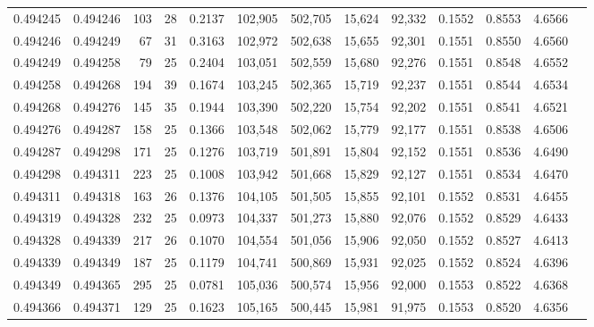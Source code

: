 \begin{tabular}{rrrrrrrrrrrrr}
0.494245 & 0.494246 & 103 &  28 &                                     0.2137 & 102,905 & 502,705 &  15,624 &  92,332 & 0.1552 & 0.8553 & 4.6566 \\
0.494246 & 0.494249 &  67 &  31 &                                     0.3163 & 102,972 & 502,638 &  15,655 &  92,301 & 0.1551 & 0.8550 & 4.6560 \\
0.494249 & 0.494258 &  79 &  25 &                                     0.2404 & 103,051 & 502,559 &  15,680 &  92,276 & 0.1551 & 0.8548 & 4.6552 \\
0.494258 & 0.494268 & 194 &  39 &                                     0.1674 & 103,245 & 502,365 &  15,719 &  92,237 & 0.1551 & 0.8544 & 4.6534 \\
0.494268 & 0.494276 & 145 &  35 &                                     0.1944 & 103,390 & 502,220 &  15,754 &  92,202 & 0.1551 & 0.8541 & 4.6521 \\
0.494276 & 0.494287 & 158 &  25 &                                     0.1366 & 103,548 & 502,062 &  15,779 &  92,177 & 0.1551 & 0.8538 & 4.6506 \\
0.494287 & 0.494298 & 171 &  25 &                                     0.1276 & 103,719 & 501,891 &  15,804 &  92,152 & 0.1551 & 0.8536 & 4.6490 \\
0.494298 & 0.494311 & 223 &  25 &                                     0.1008 & 103,942 & 501,668 &  15,829 &  92,127 & 0.1551 & 0.8534 & 4.6470 \\
0.494311 & 0.494318 & 163 &  26 &                                     0.1376 & 104,105 & 501,505 &  15,855 &  92,101 & 0.1552 & 0.8531 & 4.6455 \\
0.494319 & 0.494328 & 232 &  25 &                                     0.0973 & 104,337 & 501,273 &  15,880 &  92,076 & 0.1552 & 0.8529 & 4.6433 \\
0.494328 & 0.494339 & 217 &  26 &                                     0.1070 & 104,554 & 501,056 &  15,906 &  92,050 & 0.1552 & 0.8527 & 4.6413 \\
0.494339 & 0.494349 & 187 &  25 &                                     0.1179 & 104,741 & 500,869 &  15,931 &  92,025 & 0.1552 & 0.8524 & 4.6396 \\
0.494349 & 0.494365 & 295 &  25 &                                     0.0781 & 105,036 & 500,574 &  15,956 &  92,000 & 0.1553 & 0.8522 & 4.6368 \\
0.494366 & 0.494371 & 129 &  25 &                                     0.1623 & 105,165 & 500,445 &  15,981 &  91,975 & 0.1553 & 0.8520 & 4.6356 \\

\end{tabular}
